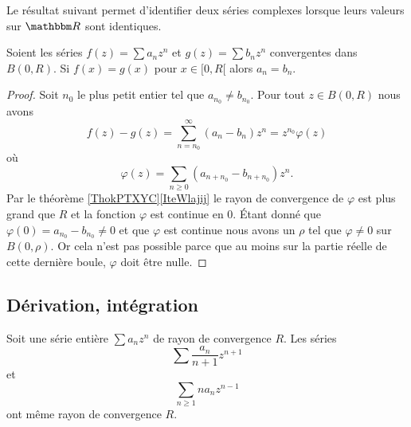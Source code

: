 
Le résultat suivant permet d'identifier deux séries complexes lorsque leurs valeurs sur \( \eR\) sont identiques.
\begin{proposition}
    Soient les séries \( f(z)=\sum a_nz^n\) et \( g(z)=\sum b_n z^n\) convergentes dans \( B(0,R)\). Si \( f(x)=g(x)\) pour \( x\in \mathopen[ 0 , R [\) alors \( a_n=b_n\).
\end{proposition}

\begin{proof}
    Soit \( n_0\) le plus petit entier tel que \( a_{n_0}\neq b_{n_0}\). Pour tout \( z\in B(0,R)\) nous avons
    \begin{equation}
        f(z)-g(z)=\sum_{n=n_0}^{\infty}(a_n-b_n)z^n=z^{n_0}\varphi(z)
    \end{equation}
    où
    \begin{equation}
        \varphi(z)=\sum_{n\geq 0}(a_{n+n_0}-b_{n+n_0})z^n.
    \end{equation}
    Par le théorème \ref{ThokPTXYC}\ref{IteWlajij} le rayon de convergence de \( \varphi\) est plus grand que \( R\) et la fonction \( \varphi\) est continue en \( 0\). Étant donné que \( \varphi(0)=a_{n_0}-b_{n_0}\neq 0\) et que \( \varphi\) est continue nous avons un \( \rho\) tel que \( \varphi\neq 0\) sur \( B(0,\rho)\). Or cela n'est pas possible parce que au moins sur la partie réelle de cette dernière boule, \( \varphi\) doit être nulle.
\end{proof}

\subsection{Dérivation, intégration}

\begin{lemma}       \label{LemFVMaSD}
    Soit une série entière \( \sum a_nz^n\) de rayon de convergence \( R\). Les séries
    \begin{equation}
        \sum \frac{ a_n }{ n+1 }z^{n+1}
    \end{equation}
    et
    \begin{equation}
        \sum_{n\geq 1}na_nz^{n-1}
    \end{equation}
    ont même rayon de convergence \( R\).
\end{lemma}

